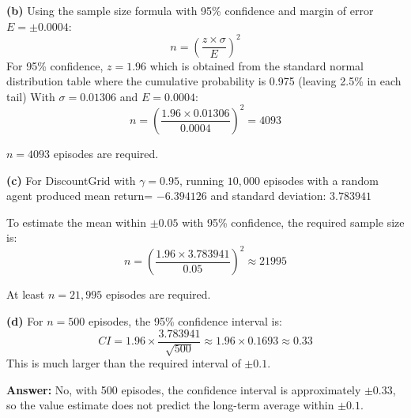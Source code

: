 \documentclass[11pt]{article}
\begin{document}
\textbf{(b)}  Using the sample size formula with 95\% confidence and margin of error \( E = \pm 0.0004 \):
\[
n = \left( \frac{z \times \sigma}{E} \right)^2
\]
For 95\% confidence, \( z = 1.96 \) which is obtained from the standard normal distribution table where the cumulative probability is 0.975 (leaving 2.5\% in each tail) 
\vspace{0.1cm}
With \( \sigma = 0.01306 \) and \( E = 0.0004 \):
\[
n = \left( \frac{1.96 \times 0.01306}{0.0004} \right)^2 = 4093
\]


\( n = 4093 \) episodes are required.

\vspace{0.2cm}

\textbf{(c)} For DiscountGrid with $\gamma = 0.95$, running $10,000$ episodes with a random agent produced mean return= $-6.394126$ and standard deviation: $3.783941$
\vspace{0.1cm}

To estimate the mean within $\pm 0.05$ with 95\% confidence, the required sample size is:
\[
n = \left( \frac{1.96 \times 3.783941}{0.05} \right)^2 \approx 21995
\]

At least $n = 21,995$ episodes are required.

\vspace{0.2cm}

\textbf{(d)} For $n = 500$ episodes, the 95\% confidence interval is:
\[
CI = 1.96 \times \frac{3.783941}{\sqrt{500}} \approx 1.96 \times 0.1693 \approx 0.33
\]
This is much larger than the required interval of $\pm 0.1$. 

\textbf{Answer:} No, with 500 episodes, the confidence interval is approximately $\pm 0.33$, so the value estimate does not predict the long-term average within $\pm 0.1$.
\end{document}
